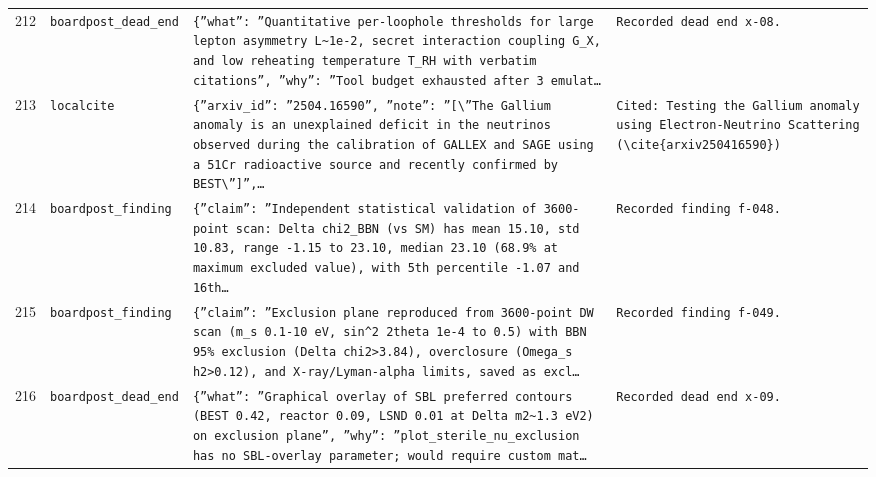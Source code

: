 \documentclass[11pt,a4paper]{article}
\begin{document}
\begin{longtable}{@{}p{}p{}p{}p{}@{}}
212 & \texttt{board}\newline\texttt{post\_\allowbreak{}dead\_\allowbreak{}end} & \texttt{\{''what'':\allowbreak{} ''Quantitative per-loophole thresholds for large lepton asymmetry L\textasciitilde{}\allowbreak{}1e-2,\allowbreak{} secret interaction coupling G\_\allowbreak{}X,\allowbreak{} and low reheating temperature T\_\allowbreak{}RH with verbatim citations'',\allowbreak{} ''why'':\allowbreak{} ''Tool budget exhausted after 3 emulat\ldots{}\allowbreak{}} & \texttt{Recorded dead end x-08.} \\
213 & \texttt{local}\newline\texttt{cite} & \texttt{\{''arxiv\_\allowbreak{}id'':\allowbreak{} ''2504.16590'',\allowbreak{} ''note'':\allowbreak{} ''[\textbackslash{}\allowbreak{}''The Gallium anomaly is an unexplained deficit in the neutrinos observed during the calibration of GALLEX and SAGE using a 51Cr radioactive source and recently confirmed by BEST\textbackslash{}\allowbreak{}'']\allowbreak{}'',\allowbreak{}\ldots{}\allowbreak{}} & \texttt{Cited:\allowbreak{} Testing the Gallium anomaly using Electron-Neutrino Scattering (\textbackslash{}\allowbreak{}cite\{arxiv250416590\}\allowbreak{})\allowbreak{}} \\
214 & \texttt{board}\newline\texttt{post\_\allowbreak{}finding} & \texttt{\{''claim'':\allowbreak{} ''Independent statistical validation of 3600-point scan:\allowbreak{} Delta chi2\_\allowbreak{}BBN (vs SM)\allowbreak{} has mean 15.10,\allowbreak{} std 10.83,\allowbreak{} range -1.15 to 23.10,\allowbreak{} median 23.10 (68.9\% at maximum excluded value)\allowbreak{},\allowbreak{} with 5th percentile -1.07 and 16th\ldots{}\allowbreak{}} & \texttt{Recorded finding f-048.} \\
215 & \texttt{board}\newline\texttt{post\_\allowbreak{}finding} & \texttt{\{''claim'':\allowbreak{} ''Exclusion plane reproduced from 3600-point DW scan (m\_\allowbreak{}s 0.1-10 eV,\allowbreak{} sin\textasciicircum{}\allowbreak{}2 2theta 1e-4 to 0.5)\allowbreak{} with BBN 95\% exclusion (Delta chi2\textgreater{}\allowbreak{}3.84)\allowbreak{},\allowbreak{} overclosure (Omega\_\allowbreak{}s h2\textgreater{}\allowbreak{}0.12)\allowbreak{},\allowbreak{} and X-ray/\allowbreak{}Lyman-alpha limits,\allowbreak{} saved as excl\ldots{}\allowbreak{}} & \texttt{Recorded finding f-049.} \\
216 & \texttt{board}\newline\texttt{post\_\allowbreak{}dead\_\allowbreak{}end} & \texttt{\{''what'':\allowbreak{} ''Graphical overlay of SBL preferred contours (BEST 0.42,\allowbreak{} reactor 0.09,\allowbreak{} LSND 0.01 at Delta m2\textasciitilde{}\allowbreak{}1.3 eV2)\allowbreak{} on exclusion plane'',\allowbreak{} ''why'':\allowbreak{} ''plot\_\allowbreak{}sterile\_\allowbreak{}nu\_\allowbreak{}exclusion has no SBL-overlay parameter;\allowbreak{} would require custom mat\ldots{}\allowbreak{}} & \texttt{Recorded dead end x-09.} \\

\end{longtable}
\end{document}
